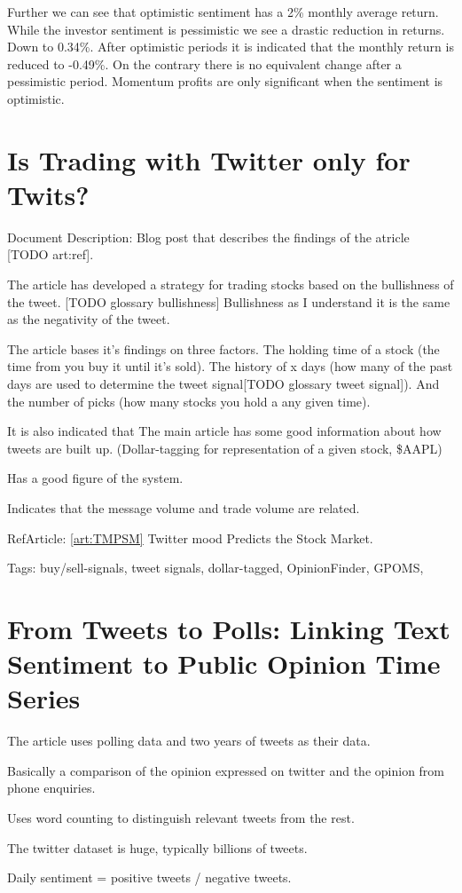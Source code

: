 Further we can see that optimistic sentiment has a 2\% monthly average return. 
While the investor sentiment is pessimistic we see a drastic reduction in
returns. Down to 0.34\%.\cite[p5]{doukas10:sentiment_and_momentum} 
After optimistic periods it is indicated that the monthly return is reduced to
-0.49\%. On the contrary there is no equivalent change after a pessimistic
period. \cite[p6-7]{doukas10:sentiment_and_momentum} 
Momentum profits are only significant when the sentiment is optimistic.
\cite[p29]{doukas10:sentiment_and_momentum}


\section{Is Trading with Twitter only for Twits?}\label{art:ITTT}
Document Description: Blog post that describes the findings of the atricle [TODO
art:ref]. 

The article has developed a strategy for trading stocks based on the
bullishness of the tweet. [TODO glossary bullishness] Bullishness as I
understand it
is the same as the negativity of the tweet. 

The article bases it's findings on three factors. The holding time of a stock
(the time from you buy it until it's sold). The history of x days (how many of
the past days are used to determine the tweet signal[TODO glossary tweet
signal]). And the number of picks (how many stocks you hold a any given
time). 

It is also indicated that The main article has some good information about how
tweets are built up. (Dollar-tagging for representation of a given stock,
\$AAPL)

Has a good figure of the system. 

Indicates that the message volume and trade volume are related. 

RefArticle: \ref{art:TMPSM} Twitter mood Predicts the Stock Market.

Tags: buy/sell-signals, tweet signals, dollar-tagged, OpinionFinder, GPOMS, 

\section{From Tweets to Polls: Linking Text Sentiment to Public Opinion
Time
Series}

The article uses polling data and two years of tweets as their data. 

Basically a comparison of the opinion expressed on twitter and the opinion from
phone enquiries. 

Uses word counting to distinguish relevant tweets from the rest. 

The twitter dataset is huge, typically billions of tweets. 

Daily sentiment = positive tweets / negative tweets.

